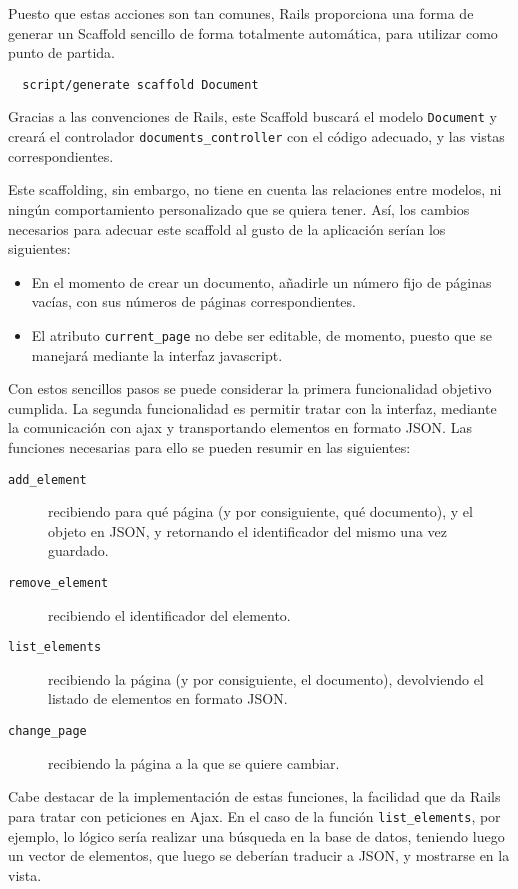 Puesto que estas acciones son tan comunes, Rails proporciona una forma de generar un Scaffold sencillo de forma totalmente automática, para utilizar como punto de partida.

\begin{verbatim}
  script/generate scaffold Document
\end{verbatim}

Gracias a las convenciones de Rails, este Scaffold buscará el modelo \texttt{Document} y creará el controlador \texttt{documents\_controller} con el código adecuado, y las vistas correspondientes.

Este scaffolding, sin embargo, no tiene en cuenta las relaciones entre modelos, ni ningún comportamiento personalizado que se quiera tener. Así, los cambios necesarios para adecuar este scaffold al gusto de la aplicación serían los siguientes:

\begin{itemize}
  \item En el momento de crear un documento, añadirle un número fijo de páginas vacías, con sus números de páginas correspondientes.
  \item El atributo \texttt{current\_page} no debe ser editable, de momento, puesto que se manejará mediante la interfaz javascript.
\end{itemize}

Con estos sencillos pasos se puede considerar la primera funcionalidad objetivo cumplida. La segunda funcionalidad es permitir tratar con la interfaz, mediante la comunicación con ajax y transportando elementos en formato JSON. Las funciones necesarias para ello se pueden resumir en las siguientes:

\begin{description}
  \item[\texttt{add\_element}] recibiendo para qué página (y por consiguiente, qué documento), y el objeto en JSON, y retornando el identificador del mismo una vez guardado.
  \item[\texttt{remove\_element}] recibiendo el identificador del elemento.
  \item[\texttt{list\_elements}] recibiendo la página (y por consiguiente, el documento), devolviendo el listado de elementos en formato JSON.
  \item[\texttt{change\_page}] recibiendo la página a la que se quiere cambiar.
\end{description}

Cabe destacar de la implementación de estas funciones, la facilidad que da Rails para tratar con peticiones en Ajax. En el caso de la función \texttt{list\_elements}, por ejemplo, lo lógico sería realizar una búsqueda en la base de datos, teniendo luego un vector de elementos, que luego se deberían traducir a JSON, y mostrarse en la vista.

